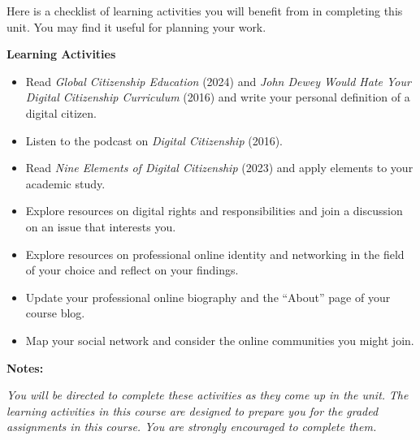\documentclass[
  letterpaper,
  DIV=11,
  numbers=noendperiod]{scrreprt}
\providecommand{\tightlist}{%
  \setlength{\itemsep}{0pt}\setlength{\parskip}{0pt}}\usepackage{longtable,booktabs,array}
\begin{document}
Here is a checklist of learning activities you will benefit from in
completing this unit. You may find it useful for planning your work.

\begin{tcolorbox}[enhanced jigsaw, toprule=.15mm, colback=white, colframe=quarto-callout-note-color-frame, bottomtitle=1mm, leftrule=.75mm, coltitle=black, titlerule=0mm, rightrule=.15mm, colbacktitle=quarto-callout-note-color!10!white, left=2mm, title={Learning Activity}, opacitybacktitle=0.6, opacityback=0, breakable, toptitle=1mm, arc=.35mm, bottomrule=.15mm]

\textbf{Learning Activities}

\begin{itemize}
\tightlist
\item
  Read \emph{Global Citizenship Education} (2024) and \emph{John Dewey
  Would Hate Your Digital Citizenship Curriculum} (2016) and write your
  personal definition of a digital citizen.
\item
  Listen to the podcast on \emph{Digital Citizenship} (2016).
\item
  Read \emph{Nine Elements of Digital Citizenship} (2023) and apply
  elements to your academic study.
\item
  Explore resources on digital rights and responsibilities and join a
  discussion on an issue that interests you.
\item
  Explore resources on professional online identity and networking in
  the field of your choice and reflect on your findings.
\item
  Update your professional online biography and the ``About'' page of
  your course blog.
\item
  Map your social network and consider the online communities you might
  join.
\end{itemize}

\begin{tcolorbox}[enhanced jigsaw, toprule=.15mm, colback=white, colframe=quarto-callout-note-color-frame, arc=.35mm, opacityback=0, breakable, rightrule=.15mm, bottomrule=.15mm, leftrule=.75mm, left=2mm]

\textbf{Notes:}

\emph{You will be directed to complete these activities as they come up
in the unit.} \emph{The learning activities in this course are designed
to prepare you for the graded assignments in this course. You are
strongly encouraged to complete them.}

\end{tcolorbox}

\end{tcolorbox}
\end{document}
